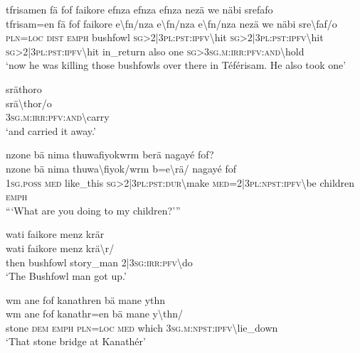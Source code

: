 \ea\label{ex:3:a7585}
tfrisamen fä fof faikore efnza efnza efnza nezä we näbi srefafo\\
\gll tfrisam=en	fä	fof	faikore	e{\textbackslash}fn/nza	e{\textbackslash}fn/nza	e{\textbackslash}fn/nza	nezä	we	näbi	sre{\textbackslash}faf/o\\
     \textsc{pln}=\textsc{loc}	\textsc{dist}	\textsc{emph}	bushfowl	\textsc{sg}>2|3\textsc{pl}:\textsc{pst}:\textsc{ipfv}{\textbackslash}hit	\textsc{sg}>2|3\textsc{pl}:\textsc{pst}:\textsc{ipfv}{\textbackslash}hit	\textsc{sg}>2|3\textsc{pl}:\textsc{pst}:\textsc{ipfv}{\textbackslash}hit	in\_return	also	one	\textsc{sg}>3\textsc{sg}.\textsc{m}:\textsc{irr}:\textsc{pfv}:\textsc{and}{\textbackslash}hold\\
\glt `now he was killing those bushfowls over there in Téférisam. He also took one'
\z

\ea\label{ex:3:a7586}
sräthoro\\
\gll srä{\textbackslash}thor/o\\
     3\textsc{sg}.\textsc{m}:\textsc{irr}:\textsc{pfv}:\textsc{and}{\textbackslash}carry\\
\glt `and carried it away.'
\z

\newpage
\ea\label{ex:3:a7587}
nzone bä nima thuwafiyokwrm berä nagayé fof?\\
\gll nzone	bä	nima	thuwa{\textbackslash}fiyok/wrm	b=e{\textbackslash}rä/	nagayé	fof\\
     1\textsc{sg}.\textsc{poss}	\textsc{med}	like\_this	\textsc{sg}>2|3\textsc{pl}:\textsc{pst}:\textsc{dur}{\textbackslash}make	\textsc{med}=2|3\textsc{pl}:\textsc{npst}:\textsc{ipfv}{\textbackslash}be	children	\textsc{emph}\\
\glt ```What are you doing to my children?'''
\z

\ea\label{ex:3:a7589}
wati faikore menz krär\\
\gll wati	faikore	menz	krä{\textbackslash}r/\\
     then	bushfowl	story\_man	2|3\textsc{sg}:\textsc{irr}:\textsc{pfv}{\textbackslash}do\\
\glt `The Bushfowl man got up.'
\z

\ea\label{ex:3:a7590}
wm ane fof kanathren bä mane ythn\\
\gll wm	ane	fof	kanathr=en	bä	mane	y{\textbackslash}thn/\\
     stone	\textsc{dem}	\textsc{emph}	\textsc{pln}=\textsc{loc}	\textsc{med}	which	3\textsc{sg}.\textsc{m}:\textsc{npst}:\textsc{ipfv}{\textbackslash}lie\_down\\
\glt `That stone bridge at Kanathér'
\z


